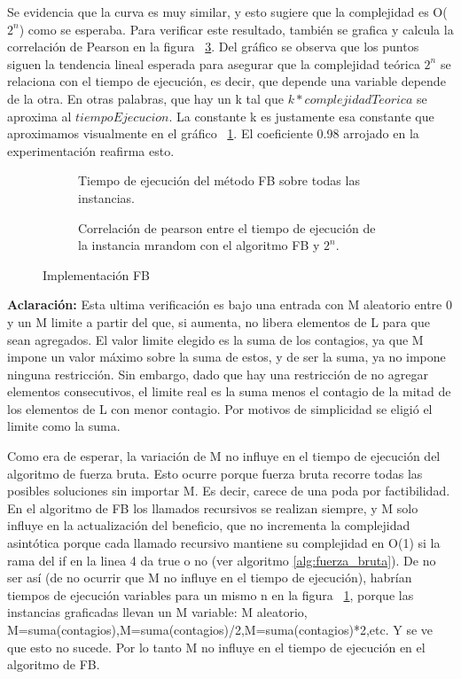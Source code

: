 \documentclass[10pt,a4paper]{article}
\begin{document}
Se evidencia que la curva es muy similar, y esto sugiere que la complejidad es O($2^n$) como se esperaba. Para verificar este resultado, también se grafica y calcula la correlación de Pearson en la figura ~\ref{fig:fb-correlacion}. Del gráfico se observa que los puntos siguen la tendencia lineal esperada para asegurar que la complejidad teórica $2^n$ se relaciona con el tiempo de ejecución, es decir, que depende una variable depende de la otra. En otras palabras, que hay un k tal que $k*complejidadTeorica$ se aproxima  al $tiempoEjecucion$. La constante k es justamente esa constante que aproximamos visualmente en el gráfico ~\ref{fig:fb-varios-casos}. El coeficiente 0.98 arrojado en la experimentación reafirma esto.

\begin{figure}[H]
    \centering
    \begin{subfigure}{0.49\linewidth}
        \centering
        
        \caption{Tiempo de ejecución del método FB sobre todas las instancias.}
        \label{fig:fb-varios-casos}
    \end{subfigure}
        \begin{subfigure}{0.49\linewidth}
        \centering
        
        \caption{Correlación de pearson entre el tiempo de ejecución de la instancia mrandom con el algoritmo FB y $2^n$.}
        \label{fig:fb-correlacion}
    \end{subfigure}
    \caption{Implementación FB}
\end{figure}

\textbf{Aclaración:} Esta ultima verificación es bajo una entrada con M aleatorio entre 0 y un M limite a partir del que, si aumenta, no libera elementos de L para que sean agregados. El valor limite elegido es la suma de los contagios, ya que M impone un valor máximo sobre la suma de estos, y de ser la suma, ya no impone ninguna restricción. Sin embargo, dado que hay una restricción de no agregar elementos consecutivos, el limite real es la suma menos el contagio de la mitad de los elementos de L con menor contagio. Por motivos de simplicidad se eligió el limite como la suma. 

Como era de esperar, la variación de M no influye en el tiempo de ejecución del algoritmo de fuerza bruta. Esto ocurre porque fuerza bruta recorre todas las posibles soluciones sin importar M. Es decir, carece de una poda por factibilidad. En el algoritmo de FB los llamados recursivos se realizan siempre, y M solo influye en la actualización del beneficio, que no incrementa la complejidad asintótica porque cada llamado recursivo mantiene su complejidad en O(1) si la rama del if en la linea 4 da true o no (ver algoritmo \ref{alg:fuerza_bruta}). De no ser así (de no ocurrir que M no influye en el tiempo de ejecución), habrían tiempos de ejecución variables para un mismo n en la figura ~\ref{fig:fb-varios-casos}, porque las instancias graficadas llevan un M variable: M aleatorio, M=suma(contagios),M=suma(contagios)/2,M=suma(contagios)*2,etc. Y se ve que esto no sucede. Por lo tanto M no influye en el tiempo de ejecución en el algoritmo de FB.
\end{document}
